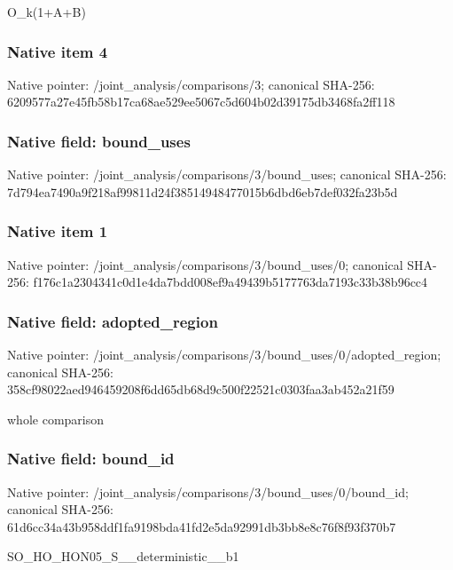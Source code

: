 \documentclass[10pt,a4paper]{article}
\begin{document}
\begingroup\raggedright\sloppy O\_\allowbreak{}k(1+A+B)\par\endgroup

\subsubsection{Native item 4}
Native pointer: /joint\_\allowbreak{}analysis/comparisons/3; canonical SHA-256: 6209577a27e45fb58b17ca68ae529ee5067c5d604b02d39175db3468fa2ff118

\subsubsection{Native field: bound\_\allowbreak{}uses}
Native pointer: /joint\_\allowbreak{}analysis/comparisons/3/bound\_\allowbreak{}uses; canonical SHA-256: 7d794ea7490a9f218af99811d24f38514948477015b6dbd6eb7def032fa23b5d

\subsubsection{Native item 1}
Native pointer: /joint\_\allowbreak{}analysis/comparisons/3/bound\_\allowbreak{}uses/0; canonical SHA-256: f176c1a2304341c0d1e4da7bdd008ef9a49439b5177763da7193c33b38b96cc4

\subsubsection{Native field: adopted\_\allowbreak{}region}
Native pointer: /joint\_\allowbreak{}analysis/comparisons/3/bound\_\allowbreak{}uses/0/adopted\_\allowbreak{}region; canonical SHA-256: 358cf98022aed946459208f6dd65db68d9c500f22521c0303faa3ab452a21f59

\begingroup\raggedright\sloppy whole comparison\par\endgroup

\subsubsection{Native field: bound\_\allowbreak{}id}
Native pointer: /joint\_\allowbreak{}analysis/comparisons/3/bound\_\allowbreak{}uses/0/bound\_\allowbreak{}id; canonical SHA-256: 61d6cc34a43b958ddf1fa9198bda41fd2e5da92991db3bb8e8c76f8f93f370b7

\begingroup\raggedright\sloppy SO\_\allowbreak{}HO\_\allowbreak{}HON05\_\allowbreak{}S\_\allowbreak{}\_\allowbreak{}deterministic\_\allowbreak{}\_\allowbreak{}b1\par\endgroup
\end{document}
